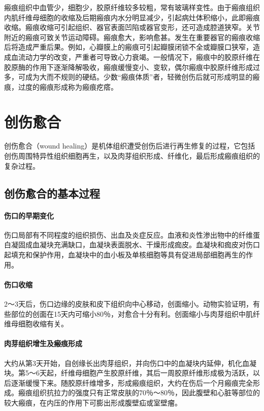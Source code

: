 瘢痕组织中血管少，细胞少，胶原纤维较多较粗，常有玻璃样变性。由于瘢痕组织内肌纤维母细胞的收缩及后期瘢痕内水分明显减少，引起病灶体积缩小，此即瘢痕收缩。瘢痕收缩可引起组织、器官表面凹陷或器官变形，还可造成腔道狭窄。关节附近的瘢痕可致关节运动障碍。瘢痕愈大，影响愈甚。发生在重要器官的瘢痕收缩后将造成严重后果。例如，心瓣膜上的瘢痕可引起瓣膜闭锁不全或瓣膜口狭窄，造成血流动力学的改变，严重者可导致心力衰竭。一般情况下，瘢痕中的胶原纤维在胶原酶的作用下逐渐降解吸收，瘢痕缓慢变小、变软，偶尔瘢痕中胶原纤维形成过多，可成为大而不规则的硬结。少数“瘢痕体质”者，轻微创伤后就可形成明显的瘢痕，过度的瘢痕形成称为瘢痕疙瘩。

\section{创伤愈合}

创伤愈合（wound
healing）是机体组织遭受创伤后进行再生修复的过程，它包括创伤周围特异性组织细胞再生，以及肉芽组织形成、纤维化，最后形成瘢痕组织的复杂过程。

\subsection{创伤愈合的基本过程}

\paragraph{伤口的早期变化}
伤口局部有不同程度的组织损伤、出血及炎症反应。血液和炎性渗出物中的纤维蛋白凝固成血凝块充满缺口，血凝块表面脱水、干燥形成痂皮。血凝块和痂皮对伤口起填充和保护作用，血凝块中的血小板及单核细胞等具有促进局部细胞再生的作用。

\paragraph{伤口收缩}
2～3天后，伤口边缘的皮肤和皮下组织向中心移动，创面缩小。动物实验证明，有些部位的创面在15天内可缩小80％，对愈合十分有利。创面缩小与肉芽组织中肌纤维母细胞收缩有关。

\paragraph{肉芽组织增生及瘢痕形成}
大约从第3天开始，自创缘长出肉芽组织，并向伤口中的血凝块内延伸，机化血凝块。第5～6天起，纤维母细胞产生胶原纤维，其后一周胶原纤维形成极为活跃，以后逐渐缓慢下来。随胶原纤维增多，形成瘢痕组织，大约在伤后一个月瘢痕完全形成。瘢痕组织抗拉力的强度只有正常皮肤的70％～80％，因此腹壁和心脏等部位的较大瘢痕，在内压的作用下可膨出形成腹壁疝或室壁瘤。

